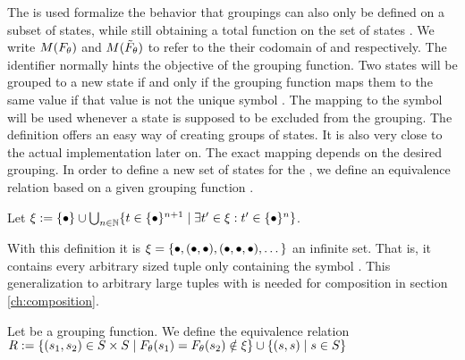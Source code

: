 \documentclass[preview]{standalone}
\begin{document}
The \grpfctsubN is used formalize the behavior that groupings can also only be defined on a subset of states, while still obtaining a total function on the set of states \states. We write $M({F_{{\theta}}})$ and $M({\tilde{F}_{{\theta}}})$ to refer to the their codomain of \grpfct and \grpfctsub respectively. The identifier \viewppty normally hints the objective of the grouping function. Two states will be grouped to a new state if and only if the grouping function maps them to the same value if that value is not the unique symbol \remelem. The mapping to the symbol \remelem will be used whenever a state is supposed to be excluded from the grouping. The definition offers an easy way of creating groups of states. It is also very close to the actual implementation later on. The exact mapping depends on the desired grouping. In order to define a new set of states for the \viewN, we define an equivalence relation \eqrelview based on a given grouping function \grpfct.

\begin{definition}
	Let ${\xi} := \{{\bullet}\} \cup \bigcup_{n \in {\mathbb{N}}} \{t \in \{{\bullet}\}^{n+1} \mid \exists t'\in {\xi} : t' \in \{{\bullet}\}^n\}$.
\end{definition}

With this definition it is ${\xi} = \{{\bullet}, ({\bullet}, {\bullet}), ({\bullet}, {\bullet}, {\bullet}), \dots\}$ an infinite set. That is, it contains every arbitrary sized tuple only containing the symbol \remelem. This generalization to arbitrary large tuples with \remelem is needed for composition in section \ref{ch:composition}.

\begin{definition}
	Let \grpfct be a grouping function. We define the equivalence relation ${R} :=\{ ({s}_1, {s}_2) \in {S} \times {S} \mid {F_{\ensuremath{{\theta}}}}({s}_1) = {F_{{\theta}}}({s}_2) \notin {\xi}\} \cup \{({s}, {s})  \mid {s} \in {S}\}$
	
	\label{def:eqrelview}
\end{definition}
\end{document}
